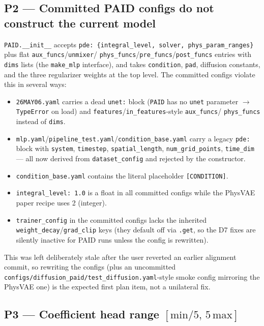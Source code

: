 \documentclass[11pt,a4paper]{article}
\newcommand{\code}[1]{\texttt{#1}}
\begin{document}
\subsection*{P2 --- Committed PAID configs do not construct the current model}

\code{PAID.\_\_init\_\_} accepts \code{pde: \{integral\_level, solver,
phys\_param\_ranges\}} plus flat \code{aux\_funcs}/\code{unmixer}/
\code{phys\_funcs}/\code{pre\_funcs}/\code{post\_funcs} entries with \code{dims}
lists (the \code{make\_mlp} interface), and takes \code{condition}, \code{pad},
diffusion constants, and the three regularizer weights at the top level.
The committed configs violate this in several ways:

\begin{itemize}[nosep]
  \item \code{26MAY06.yaml} carries a dead \code{unet:} block (\code{PAID} has no
        \code{unet} parameter $\to$ \code{TypeError} on load) and
        \code{features}/\code{in\_features}-style \code{aux\_funcs}/
        \code{phys\_funcs} instead of \code{dims}.
  \item \code{mlp.yaml}/\code{pipeline\_test.yaml}/\code{condition\_base.yaml}
        carry a legacy \code{pde:} block with \code{system}, \code{timestep},
        \code{spatial\_length}, \code{num\_grid\_points}, \code{time\_dim} ---
        all now derived from \code{dataset\_config} and rejected by the
        constructor.
  \item \code{condition\_base.yaml} contains the literal placeholder
        \code{[CONDITION]}.
  \item \code{integral\_level: 1.0} is a float in all committed configs while the
        PhysVAE paper recipe uses 2 (integer).
  \item \code{trainer\_config} in the committed configs lacks the inherited
        \code{weight\_decay}/\code{grad\_clip} keys (they default off via
        \code{.get}, so the D7 fixes are silently inactive for PAID runs unless
        the config is rewritten).
\end{itemize}

This was left deliberately stale after the user reverted an earlier alignment
commit, so rewriting the configs (plus an uncommitted
\code{configs/diffusion\_paid/test\_diffusion.yaml}-style smoke config mirroring
the PhysVAE one) is the expected first plan item, not a unilateral fix.

\subsection*{P3 --- Coefficient head range $[\mathrm{min}/5,\,5\,\mathrm{max}]$}
\end{document}
